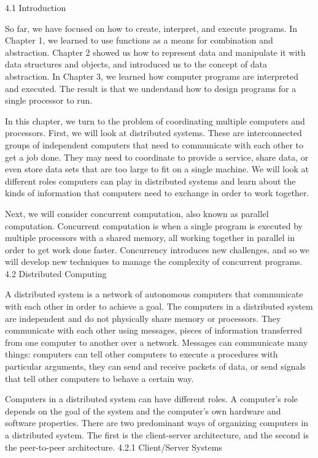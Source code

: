 \documentclass[letterpaper,10pt,dvipdfmx]{sphinxmanual}
\begin{document}
4.1   Introduction

So far, we have focused on how to create, interpret, and execute programs. In Chapter 1, we learned to use functions as a means for combination and abstraction. Chapter 2 showed us how to represent data and manipulate it with data structures and objects, and introduced us to the concept of data abstraction. In Chapter 3, we learned how computer programs are interpreted and executed. The result is that we understand how to design programs for a single processor to run.

In this chapter, we turn to the problem of coordinating multiple computers and processors. First, we will look at distributed systems. These are interconnected groups of independent computers that need to communicate with each other to get a job done. They may need to coordinate to provide a service, share data, or even store data sets that are too large to fit on a single machine. We will look at different roles computers can play in distributed systems and learn about the kinds of information that computers need to exchange in order to work together.

Next, we will consider concurrent computation, also known as parallel computation. Concurrent computation is when a single program is executed by multiple processors with a shared memory, all working together in parallel in order to get work done faster. Concurrency introduces new challenges, and so we will develop new techniques to manage the complexity of concurrent programs.
4.2   Distributed Computing

A distributed system is a network of autonomous computers that communicate with each other in order to achieve a goal. The computers in a distributed system are independent and do not physically share memory or processors. They communicate with each other using messages, pieces of information transferred from one computer to another over a network. Messages can communicate many things: computers can tell other computers to execute a procedures with particular arguments, they can send and receive packets of data, or send signals that tell other computers to behave a certain way.

Computers in a distributed system can have different roles. A computer's role depends on the goal of the system and the computer's own hardware and software properties. There are two predominant ways of organizing computers in a distributed system. The first is the client-server architecture, and the second is the peer-to-peer architecture.
4.2.1   Client/Server Systems
\end{document}
